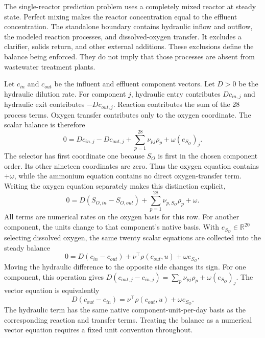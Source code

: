 The single-reactor prediction problem uses a completely mixed reactor at steady state. Perfect mixing makes the reactor concentration equal to the effluent concentration. The standalone boundary contains hydraulic inflow and outflow, the modeled reaction processes, and dissolved-oxygen transfer. It excludes a clarifier, solids return, and other external additions. These exclusions define the balance being enforced. They do not imply that those processes are absent from wastewater treatment plants.

Let $c_{in}$ and $c_{out}$ be the influent and effluent component vectors. Let $D>0$ be the hydraulic dilution rate. For component $j$, hydraulic entry contributes $Dc_{in,j}$ and hydraulic exit contributes $-Dc_{out,j}$. Reaction contributes the sum of the 28 process terms. Oxygen transfer contributes only to the oxygen coordinate. The scalar balance is therefore
\[
0=Dc_{in,j}-Dc_{out,j}
+\sum_{p=1}^{28}\nu_{pj}\rho_p+\omega(e_{S_O})_j.
\]
The selector has first coordinate one because $S_O$ is first in the chosen component order. Its other nineteen coordinates are zero. Thus the oxygen equation contains $+\omega$, while the ammonium equation contains no direct oxygen-transfer term. Writing the oxygen equation separately makes this distinction explicit,
\[
0=D(S_{O,in}-S_{O,out})+\sum_{p=1}^{28}\nu_{p,S_O}\rho_p+\omega.
\]
All terms are numerical rates on the oxygen basis for this row. For another component, the units change to that component's native basis. With $e_{S_O}\in\mathbb{R}^{20}$ selecting dissolved oxygen, the same twenty scalar equations are collected into the steady balance
\begin{equation}
0=D(c_{in}-c_{out})+\nu^\top\rho(c_{out},u)+\omega e_{S_O},
\label{eq:reactor_steady_balance}
\end{equation}
Moving the hydraulic difference to the opposite side changes its sign. For one component, this operation gives $D(c_{out,j}-c_{in,j})=\sum_p\nu_{pj}\rho_p+\omega(e_{S_O})_j$. The vector equation is equivalently
\begin{equation}
D(c_{out}-c_{in})=\nu^\top\rho(c_{out},u)+\omega e_{S_O}.
\label{eq:reactor_steady_difference}
\end{equation}
The hydraulic term has the same native component-unit-per-day basis as the corresponding reaction and transfer terms. Treating the balance as a numerical vector equation requires a fixed unit convention throughout.

